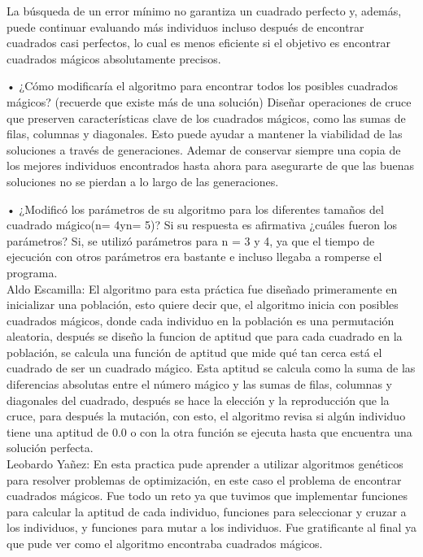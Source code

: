 \documentclass{report}
\begin{document}
    La búsqueda de un error mínimo no garantiza un cuadrado perfecto y, además, puede continuar evaluando más individuos incluso después de encontrar cuadrados casi perfectos, lo cual es menos eficiente si el objetivo es encontrar cuadrados mágicos absolutamente precisos.

    •  ¿Cómo modificaría el algoritmo para encontrar todos los posibles cuadrados mágicos? (recuerde que existe más de una solución)
    Diseñar operaciones de cruce que preserven características clave de los cuadrados mágicos, como las sumas de filas, columnas y diagonales. Esto puede ayudar a mantener la viabilidad de las soluciones a través de generaciones.
    Ademar de conservar siempre una copia de los mejores individuos encontrados hasta ahora para asegurarte de que las buenas soluciones no se pierdan a lo largo de las generaciones.

    •  ¿Modificó  los  parámetros  de  su  algoritmo  para  los  diferentes  tamaños  del  cuadrado  mágico(n= 4yn= 5)? Si su respuesta es afirmativa ¿cuáles fueron los parámetros?
    Si, se utilizó parámetros para n = 3 y 4, ya que el tiempo de ejecución con otros parámetros era bastante e incluso llegaba a romperse el programa.\\
    
    Aldo Escamilla: El algoritmo para esta práctica fue diseñado primeramente en inicializar una población, esto quiere decir que, el algoritmo inicia con posibles cuadrados mágicos, donde cada individuo en la población es una permutación aleatoria, después se diseño la funcion de aptitud que para cada cuadrado en la población, se calcula una función de aptitud que mide qué tan cerca está el cuadrado de ser un cuadrado mágico. Esta aptitud se calcula como la suma de las diferencias absolutas entre el número mágico y las sumas de filas, columnas y diagonales del cuadrado, después se hace la elección y la reproducción que la cruce, para después la mutación, con esto, el algoritmo revisa si algún individuo tiene una aptitud de 0.0 o con la otra función se ejecuta hasta que encuentra una solución perfecta.\\

    Leobardo Yañez: En esta practica pude aprender a utilizar algoritmos genéticos para resolver problemas de optimización, en este caso el problema de encontrar cuadrados mágicos. Fue todo un reto ya que tuvimos que implementar funciones para calcular la aptitud de cada individuo, funciones para seleccionar y cruzar a los individuos, y funciones para mutar a los individuos. Fue gratificante al final ya que pude ver como el algoritmo encontraba cuadrados mágicos.\\
\end{document}
